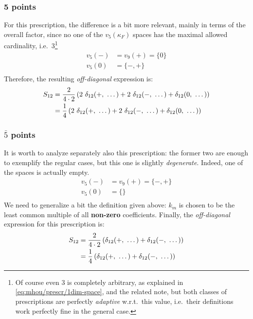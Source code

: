 \subsubsection{5 points}

For this prescription, the difference is a bit more relevant, mainly in terms
of the overall factor, since no one of the $v_5(\kappa_F)$ spaces has the
maximal allowed cardinality, i.e.\ $3$\footnote{
    Of course even 3 is completely arbitrary, as explained in
    \cref{eq:mhou/prescr/1dim-space}, and the related note, but both classes of
    prescriptions are perfectly \textit{adaptive} w.r.t.\ this value,
    i.e.\ their definitions work perfectly fine in the general case.
}
\begin{align}
    \label{eq:mhou/prescr/9specs-slices}
    v_5(-) &= v_9(+) = \{0\}\\
    v_5(0) &= \{-, +\}\\
\end{align}
Therefore, the resulting \textit{off-diagonal} expression is:
\begin{align}
    S_{12} &= \frac{2}{4 \cdot 2} \left(2\ \deltagroup{+} + 2\ \deltagroup{-} + \deltagroup{0}\right)\\
        &= \frac{1}{4} \left(2\ \deltagroup{+} + 2\ \deltagroup{-} + \deltagroup{0}\right)
\end{align}

\subsubsection{$\bar{5}$ points}

It is worth to analyze separately also this prescription: the former two are
enough to exemplify the regular cases, but this one is slightly
\textit{degenerate}.
Indeed, one of the spaces is actually empty.
\begin{align}
    \label{eq:mhou/prescr/5bar-specs-slices}
    v_5(-) &= v_9(+) = \{-, +\}\\
    v_5(0) &= \{\}\\
\end{align}
We need to generalize a bit the definition given above: $k_m$ is chosen to be
the least common multiple of all \textbf{non-zero} coefficients.
Finally, the \textit{off-diagonal} expression for this prescription is:
\begin{align}
    S_{12} &= \frac{2}{4 \cdot 2} \left(\delta_{12}(+,\ \dots) + \delta_{12}(-,\ \dots)\right)\\
        &= \frac{1}{4} \left(\delta_{12}(+,\ \dots) + \delta_{12}(-,\ \dots)\right)
\end{align}
